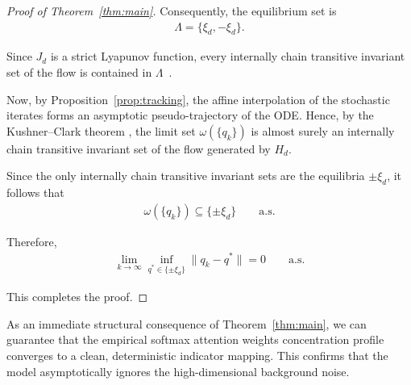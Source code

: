 \documentclass[11pt,a4paper]{article}
\theoremstyle{definition}
\begin{document}
\begin{proof}[Proof of Theorem~\ref{thm:main}]
Consequently, the equilibrium set is
\begin{align}
\Lambda = \{\xi_d, -\xi_d\}.
\end{align}

Since $J_d$ is a strict Lyapunov function, every internally chain transitive invariant set of the flow is contained in $\Lambda$~\cite{benaim1999dynamics}. 

Now, by Proposition~\ref{prop:tracking}, the affine interpolation of the stochastic iterates forms an asymptotic pseudo-trajectory of the ODE. Hence, by the Kushner–Clark theorem \cite{kushner1978, benaim1999dynamics}, the limit set $\omega(\{q_k\})$ is almost surely an internally chain transitive invariant set of the flow generated by $H_d$.

Since the only internally chain transitive invariant sets are the equilibria $\pm \xi_d$, it follows that
\begin{align}
\omega(\{q_k\})
\subseteq
\{\pm\xi_d\}
\qquad \text{a.s.}
\end{align}

Therefore,
\begin{align}
\lim_{k\to\infty}
\inf_{q^\ast\in\{\pm\xi_d\}}
\|q_k-q^\ast\|
=
0
\qquad \text{a.s.}
\end{align}

This completes the proof.
\end{proof}


\noindent As an immediate structural consequence of Theorem~\ref{thm:main}, we can guarantee that the empirical softmax attention weights concentration profile converges to a clean, deterministic indicator mapping. This confirms that the model asymptotically ignores the high-dimensional background noise.
\end{document}
